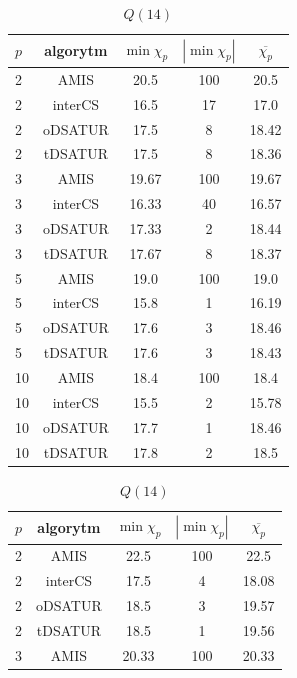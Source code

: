 \documentclass[10pt,a4paper]{article}
\begin{document}
\begin{table}[H]
\begin{minipage}{.5\linewidth}
			\caption{$Q(13)$}
		\end{minipage}
		\begin{minipage}{.5\linewidth}
			\centering
			\begin{tabular}{|l|c|c|c|c|}
				\hline
				\textbf{$p$} & \textbf{algorytm} & \textbf{$\min \chi_{p}$} & \textbf{$|\min \chi_{p}|$} & \textbf{$\overline{\chi_{p}}$} \\
				\hline
				2 & AMIS & 20.5 & 100 & 20.5 \\
				2 & interCS & 16.5 & 17 & 17.0 \\
				2 & oDSATUR & 17.5 & 8 & 18.42 \\
				2 & tDSATUR & 17.5 & 8 & 18.36 \\
				\hline
				3 & AMIS & 19.67 & 100 & 19.67 \\
				3 & interCS & 16.33 & 40 & 16.57 \\
				3 & oDSATUR & 17.33 & 2 & 18.44 \\
				3 & tDSATUR & 17.67 & 8 & 18.37 \\
				\hline
				5 & AMIS & 19.0 & 100 & 19.0 \\
				5 & interCS & 15.8 & 1 & 16.19 \\
				5 & oDSATUR & 17.6 & 3 & 18.46 \\
				5 & tDSATUR & 17.6 & 3 & 18.43 \\
				\hline
				10 & AMIS & 18.4 & 100 & 18.4 \\
				10 & interCS & 15.5 & 2 & 15.78 \\
				10 & oDSATUR & 17.7 & 1 & 18.46 \\
				10 & tDSATUR & 17.8 & 2 & 18.5 \\
				\hline
			\end{tabular}
			\caption{$Q(14)$}
		\end{minipage}
		\begin{minipage}{.5\linewidth}
			\centering
			\begin{tabular}{|l|c|c|c|c|}
				\hline
				\textbf{$p$} & \textbf{algorytm} & \textbf{$\min \chi_{p}$} & \textbf{$|\min \chi_{p}|$} & \textbf{$\overline{\chi_{p}}$} \\
				\hline
				2 & AMIS & 22.5 & 100 & 22.5 \\
				2 & interCS & 17.5 & 4 & 18.08 \\
				2 & oDSATUR & 18.5 & 3 & 19.57 \\
				2 & tDSATUR & 18.5 & 1 & 19.56 \\
				\hline
				3 & AMIS & 20.33 & 100 & 20.33 \\

\end{tabular}
\end{minipage}
\end{table}
\end{document}
